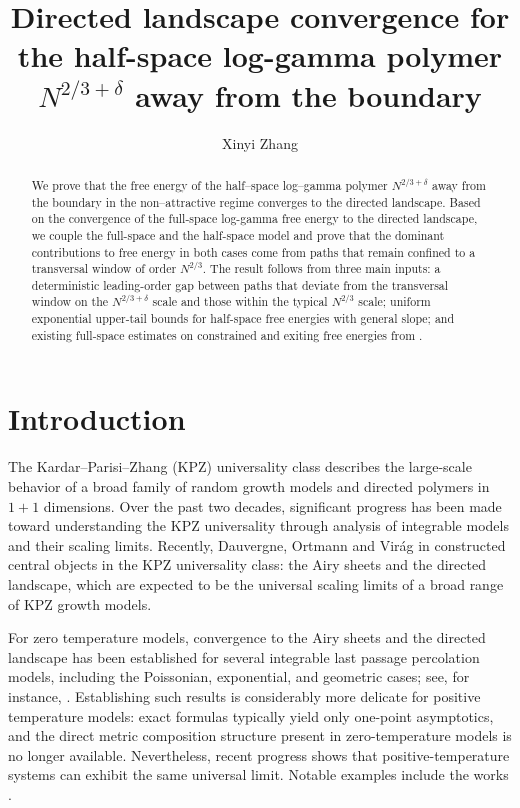 \documentclass[11pt]{article}
\title{Directed landscape convergence for the half-space log-gamma polymer
$N^{2/3+\delta}$ away from the boundary}
\author{Xinyi Zhang}
\theoremstyle{definition}
\begin{document}
\maketitle
\begin{abstract}
We prove that the free energy of the half–space log–gamma polymer $N^{2/3+\delta}$ away from the boundary in the non–attractive regime converges to the directed landscape. Based on the convergence of the full-space log-gamma free energy to the directed landscape, we couple the full-space and the half-space model and prove that the dominant contributions to free energy in both cases
come from paths that remain confined to a transversal window of order $N^{2/3}$. The result follows from three main inputs: a deterministic
leading-order gap between paths that deviate
from the transversal window on the $N^{2/3+\delta}$ scale and those within the
typical $N^{2/3}$ scale; uniform exponential upper-tail bounds for half-space free energies with general slope; and existing full-space
estimates on constrained and exiting free energies from
\cite{basu2024temporal}. 
\end{abstract}

\section{Introduction}
The Kardar--Parisi--Zhang (KPZ) universality class describes the
large-scale behavior of a broad family of random growth models and
directed polymers in $1+1$ dimensions. Over the past two decades, significant progress has been made toward understanding the KPZ universality through analysis of integrable models and their scaling limits. Recently, Dauvergne, Ortmann and Vir\'ag in \cite{dauvergne2022directed} constructed central objects in the KPZ universality class: the Airy sheets and the directed landscape, which are expected to be the universal scaling limits of a broad range of KPZ growth models.

For zero temperature models, convergence to the Airy sheets and the directed landscape has been established for several integrable last passage percolation models, including the Poissonian, exponential, and geometric cases; see, for instance, \cite{dauvergne2021scaling,dauvergne2023uniform}. Establishing such results is considerably more delicate for positive temperature models: exact formulas typically yield only one-point asymptotics, and the direct metric composition structure present in zero-temperature models is no longer available. Nevertheless, recent progress shows that positive-temperature systems can exhibit the same universal limit. Notable examples include the works \cite{wu2023kpz,aggarwal2024scaling,zhang2025convergence}.
\end{document}
